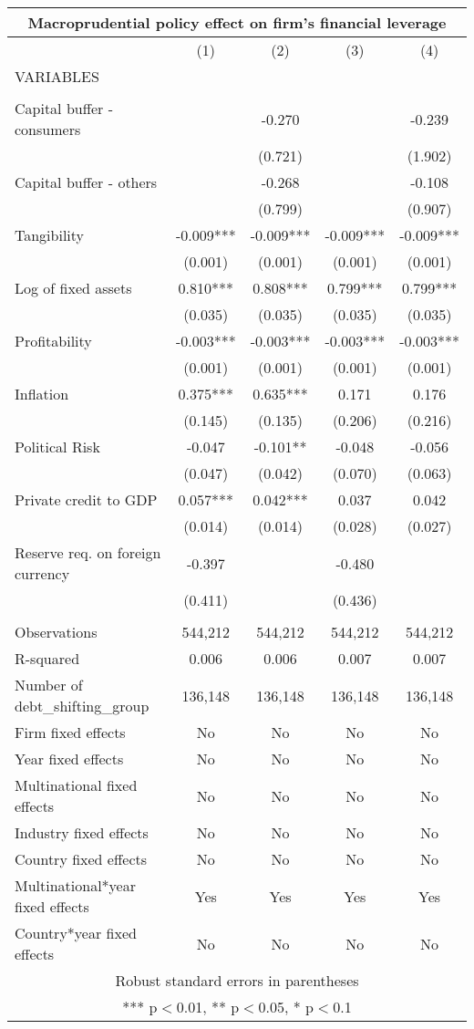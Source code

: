 \begin{tabular}{lcccc}
\multicolumn{5}{c}{Macroprudential policy effect on firm's financial leverage} \\ \hline
 & (1) & (2) & (3) & (4) \\
VARIABLES &  &  &  &  \\ \hline
 &  &  &  &  \\
Capital buffer - consumers &  & -0.270 &  & -0.239 \\
 &  & (0.721) &  & (1.902) \\
Capital buffer - others &  & -0.268 &  & -0.108 \\
 &  & (0.799) &  & (0.907) \\
Tangibility & -0.009*** & -0.009*** & -0.009*** & -0.009*** \\
 & (0.001) & (0.001) & (0.001) & (0.001) \\
Log of fixed assets & 0.810*** & 0.808*** & 0.799*** & 0.799*** \\
 & (0.035) & (0.035) & (0.035) & (0.035) \\
Profitability & -0.003*** & -0.003*** & -0.003*** & -0.003*** \\
 & (0.001) & (0.001) & (0.001) & (0.001) \\
Inflation & 0.375*** & 0.635*** & 0.171 & 0.176 \\
 & (0.145) & (0.135) & (0.206) & (0.216) \\
Political Risk & -0.047 & -0.101** & -0.048 & -0.056 \\
 & (0.047) & (0.042) & (0.070) & (0.063) \\
Private credit to GDP & 0.057*** & 0.042*** & 0.037 & 0.042 \\
 & (0.014) & (0.014) & (0.028) & (0.027) \\
Reserve req. on foreign currency & -0.397 &  & -0.480 &  \\
 & (0.411) &  & (0.436) &  \\
 &  &  &  &  \\
Observations & 544,212 & 544,212 & 544,212 & 544,212 \\
R-squared & 0.006 & 0.006 & 0.007 & 0.007 \\
Number of debt\_shifting\_group & 136,148 & 136,148 & 136,148 & 136,148 \\
Firm fixed effects & No & No & No & No \\
Year fixed effects & No & No & No & No \\
Multinational fixed effects & No & No & No & No \\
Industry fixed effects & No & No & No & No \\
Country fixed effects & No & No & No & No \\
Multinational*year fixed effects & Yes & Yes & Yes & Yes \\
 Country*year fixed effects & No & No & No & No \\ \hline
\multicolumn{5}{c}{ Robust standard errors in parentheses} \\
\multicolumn{5}{c}{ *** p$<$0.01, ** p$<$0.05, * p$<$0.1} \\
\end{tabular}
